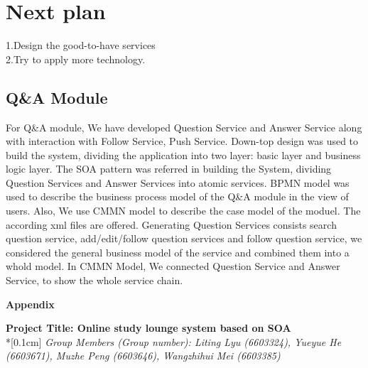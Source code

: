 \documentclass[runningheads]{llncs}
\begin{document}
\section{Next plan}
1.Design the good-to-have services
\\2.Try to apply more technology.
\subsection*{Q\&A Module} %
\noindent
For Q\&A module, We have developed Question Service and Answer Service along with interaction with Follow Service, Push Service. Down-top design was used to build the system, dividing the application into two layer: basic layer and business logic layer. The SOA pattern was referred in building the System, dividing Question Services and Answer Services into atomic services. BPMN model was used to describe the business process model of the Q\&A module in the view of users. Also, We use CMMN model to describe the case model of the moduel. The according xml files are offered.
Generating Question Services consists search question service, add/edit/follow question services and follow question service, we considered the general business model of the service and combined them into a whold model. In CMMN Model, We connected Question Service and Answer Service, to show the whole service chain.



\clearpage
\begin{flushleft}
    \huge{\textbf{Appendix}}
\end{flushleft}
\begin{center}
    \Large{\textbf{Project Title: Online study lounge system based on SOA }} \\*[0.1cm]%
    \large{\emph{Group Members (Group number): Liting Lyu (6603324), Yueyue  He (6603671), Muzhe Peng (6603646), Wangzhihui Mei (6603385)}} %
\end{center}
    
\end{document}
